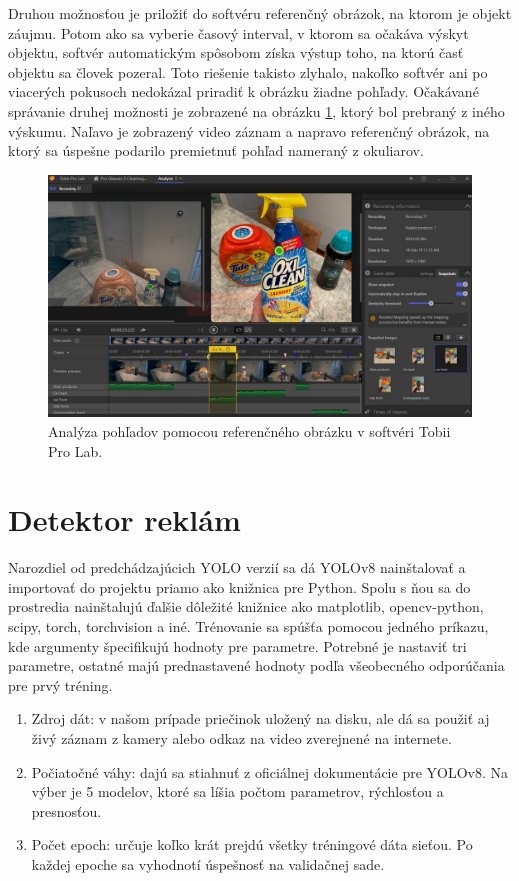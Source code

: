 Druhou možnosťou je priložiť do softvéru referenčný obrázok, na ktorom je objekt záujmu. Potom ako sa vyberie časový interval, v ktorom sa očakáva výskyt objektu, softvér automatickým spôsobom získa výstup toho, na ktorú časť objektu sa človek pozeral. Toto riešenie takisto zlyhalo, nakoľko softvér ani po viacerých pokusoch nedokázal priradiť k obrázku žiadne pohľady. Očakávané správanie druhej možnosti je zobrazené na obrázku \ref{img:lab}, ktorý bol prebraný z iného výskumu. Naľavo je zobrazený video záznam a napravo referenčný obrázok, na ktorý sa úspešne podarilo premietnuť pohľad nameraný z okuliarov.
\\
\begin{figure}[ht]
    \centering
    \includegraphics[width=1\textwidth]{images/04/snapshot.png}
    \caption{Analýza pohľadov pomocou referenčného obrázku v softvéri Tobii Pro Lab.}
    \label{img:lab}
\end{figure}

\section{Detektor reklám}

Narozdiel od predchádzajúcich YOLO verzií sa dá YOLOv8 nainštalovať a importovať do projektu priamo ako knižnica pre Python. Spolu s ňou sa do prostredia nainštalujú ďalšie dôležité knižnice ako matplotlib, opencv-python, scipy, torch, torchvision a iné. Trénovanie sa spúšťa pomocou jedného príkazu, kde argumenty špecifikujú hodnoty pre parametre. Potrebné je nastaviť tri parametre, ostatné majú prednastavené hodnoty podľa všeobecného odporúčania pre prvý tréning.

\begin{enumerate}
    \item Zdroj dát: v našom prípade priečinok uložený na disku, ale dá sa použiť aj živý záznam z kamery alebo odkaz na video zverejnené na internete.
    \item Počiatočné váhy: dajú sa stiahnuť z oficiálnej dokumentácie pre YOLOv8. Na výber je 5 modelov, ktoré sa líšia počtom parametrov, rýchlosťou a presnosťou.
    \item Počet epoch: určuje koľko krát prejdú všetky tréningové dáta sieťou. Po každej epoche sa vyhodnotí úspešnosť na validačnej sade.
\end{enumerate}

